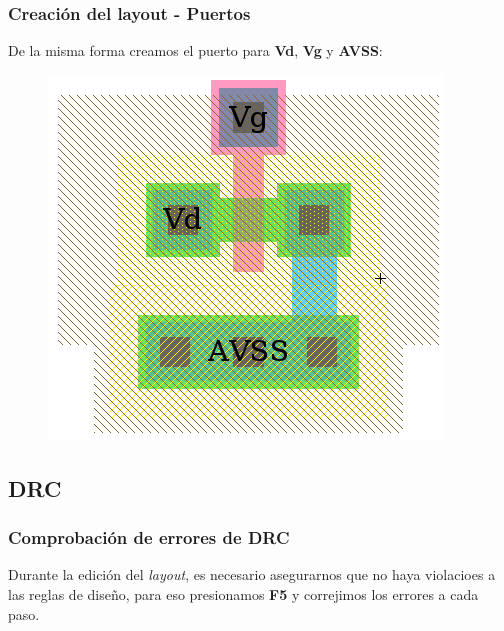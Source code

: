 \documentclass{beamer}
\begin{document}
\begin{frame}
\frametitle{Creación del layout - Puertos}
De la misma forma creamos el puerto para \textbf{Vd}, \textbf{Vg} y \textbf{AVSS}:
\begin{figure}
  \includegraphics[width=0.51\linewidth]{figuras/edicionElectric-11a.png}
\end{figure}
\end{frame}
\subsection{DRC}
\begin{frame}
\frametitle{Comprobación de errores de DRC}
Durante la edición del \emph{layout}, es necesario asegurarnos que no haya violacioes a las reglas de diseño, para eso presionamos \textbf{F5} y correjimos los errores a cada paso.
\end{frame}
\end{document}

